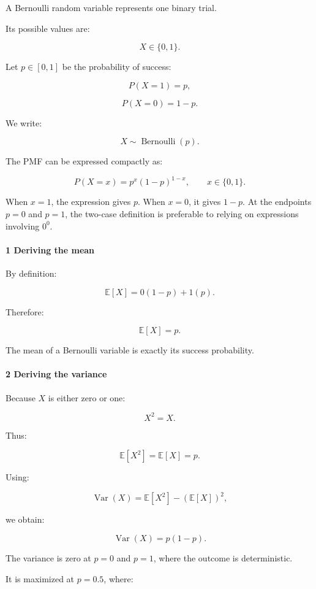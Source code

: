 A Bernoulli random variable represents one binary trial.

Its possible values are:

\[
 X\in\{0,1\}.
\]

Let \(p\in[0,1]\) be the probability of success:

\[
 P(X=1)=p,
\]

\[
 P(X=0)=1-p.
\]

We write:

\[
 \boxed{X\sim\operatorname{Bernoulli}(p)}.
\]

The PMF can be expressed compactly as:

\[
 \boxed{ P(X=x)=p^x(1-p)^{1-x}, \qquad x\in\{0,1\} }.
\]

When \(x=1\), the expression gives \(p\). When \(x=0\), it gives \(1-p\). At the endpoints \(p=0\) and \(p=1\), the two-case definition is preferable to relying on expressions involving \(0^0\).

\paragraph{1 Deriving the mean}\label{deriving-the-mean}

By definition:

\[
 \mathbb E[X] = 0(1-p)+1(p).
\]

Therefore:

\[
 \boxed{\mathbb E[X]=p}.
\]

The mean of a Bernoulli variable is exactly its success probability.

\paragraph{2 Deriving the variance}\label{deriving-the-variance}

Because \(X\) is either zero or one:

\[
 X^2=X.
\]

Thus:

\[
 \mathbb E[X^2]=\mathbb E[X]=p.
\]

Using:

\[
 \operatorname{Var}(X)= \mathbb E[X^2]-(\mathbb E[X])^2,
\]

we obtain:

\[
 \boxed{ \operatorname{Var}(X)=p(1-p) }.
\]

The variance is zero at \(p=0\) and \(p=1\), where the outcome is deterministic.

It is maximized at \(p=0.5\), where:

